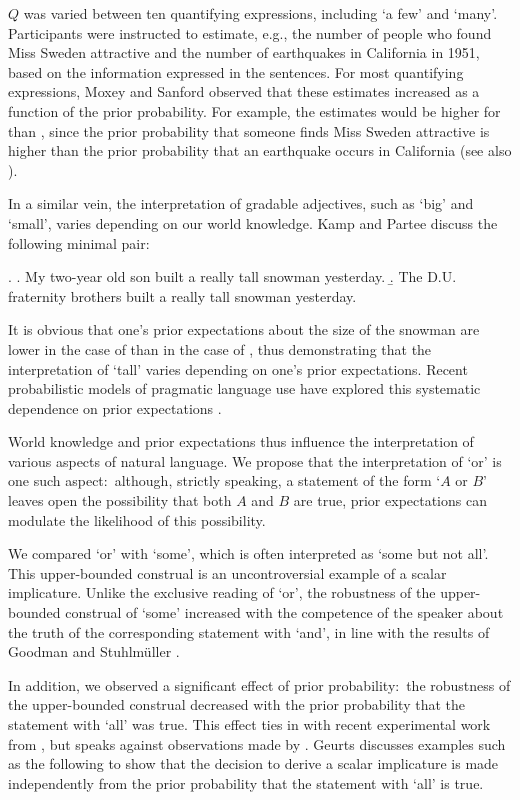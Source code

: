 \documentclass[12pt]{article}
\begin{document}
$Q$ was varied between ten quantifying expressions, including `a few' and `many'. Participants were instructed to estimate, e.g., the number of people who found Miss Sweden attractive and the number of earthquakes in California in 1951, based on the information expressed in the sentences. For most quantifying expressions, Moxey and Sanford observed that these estimates increased as a function of the prior probability. For example, the estimates would be higher for \Last[a] than \Last[b], since the prior probability that someone finds Miss Sweden attractive is higher than the prior probability that an earthquake occurs in California (see also \citealt{pepper1974}).

In a similar vein, the interpretation of gradable adjectives, such as `big' and `small', varies depending on our world knowledge. Kamp and Partee \citeyearpar{kamp1995} discuss the following minimal pair:

\ex.	\a. My two-year old son built a really tall snowman yesterday.
	\b. The D.U. fraternity brothers built a really tall snowman yesterday.
	
It is obvious that one's prior expectations about the size of the snowman are lower in the case
of \Last[a] than in the case of \Last[b], thus demonstrating that the interpretation of `tall'
varies depending on one's prior expectations. Recent probabilistic models of pragmatic language
use have explored this systematic dependence on prior expectations
\citep[cf.,][]{LassiterGoodman2015:Adjectival-vagu,QingFranke2014:Gradable-Adject,SchollerFranke2015:Semantic-values}.

World knowledge and prior expectations thus influence the interpretation of various aspects of natural language. We propose that the interpretation of `or' is one such aspect:\ although, strictly speaking, a statement of the form `$A$ or $B$' leaves open the possibility that both $A$ and $B$ are true, prior expectations can modulate the likelihood of this possibility.

We compared `or' with `some', which is often interpreted as `some but not all'. This upper-bounded construal is an uncontroversial example of a scalar implicature. Unlike the exclusive reading of `or', the robustness of the upper-bounded construal of `some' increased with the competence of the speaker about the truth of the corresponding statement with `and', in line with the results of Goodman and Stuhlm\"{u}ller \citeyearpar{goodman2013}. 

In addition, we observed a significant effect of prior probability:\ the robustness of the upper-bounded construal decreased with the prior probability that the statement with `all' was true. This effect ties in with recent experimental work from \citet{degen2015}, but speaks against observations made by \citet{geurts2010}. Geurts discusses examples such as the following to show that the decision to derive a scalar implicature is made independently from the prior probability that the statement with `all' is true.
\end{document}
